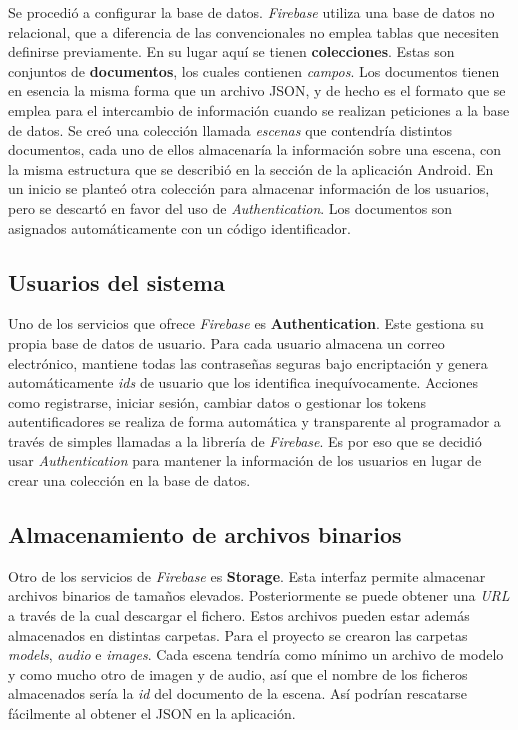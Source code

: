 Se procedió a configurar la base de datos. \textit{Firebase} utiliza una base de datos no relacional, que a diferencia de las convencionales no emplea tablas que necesiten definirse previamente. En su lugar aquí se tienen \textbf{colecciones}. Estas son conjuntos de \textbf{documentos}, los cuales contienen \textit{campos}. Los documentos tienen en esencia la misma forma que un archivo JSON, y de hecho es el formato que se emplea para el intercambio de información cuando se realizan peticiones a la base de datos. Se creó una colección llamada \textit{escenas} que contendría distintos documentos, cada uno de ellos almacenaría la información sobre una escena, con la misma estructura que se describió en la sección de la aplicación Android. En un inicio se planteó otra colección para almacenar información de los usuarios, pero se descartó en favor del uso de \textit{Authentication}. Los documentos son asignados automáticamente con un código identificador.

\subsection{Usuarios del sistema}

Uno de los servicios que ofrece \textit{Firebase} es \textbf{Authentication}. Este gestiona su propia base de datos de usuario. Para cada usuario almacena un correo electrónico, mantiene todas las contraseñas seguras bajo encriptación y genera automáticamente \textit{ids} de usuario que los identifica inequívocamente. Acciones como registrarse, iniciar sesión, cambiar datos o gestionar los tokens autentificadores se realiza de forma automática y transparente al programador a través de simples llamadas a la librería de \textit{Firebase}. Es por eso que se decidió usar \textit{Authentication} para mantener la información de los usuarios en lugar de crear una colección en la base de datos.

\subsection{Almacenamiento de archivos binarios}

Otro de los servicios de \textit{Firebase} es \textbf{Storage}. Esta interfaz permite almacenar archivos binarios de tamaños elevados. Posteriormente se puede obtener una \textit{URL} a través de la cual descargar el fichero. Estos archivos pueden estar además almacenados en distintas carpetas. Para el proyecto se crearon las carpetas \textit{models}, \textit{audio} e \textit{images}. Cada escena tendría como mínimo un archivo de modelo y como mucho otro de imagen y de audio, así que el nombre de los ficheros almacenados sería la \textit{id} del documento de la escena. Así podrían rescatarse fácilmente al obtener el JSON en la aplicación.

